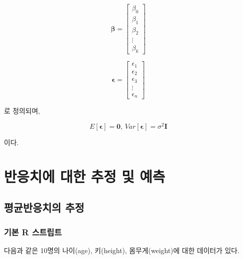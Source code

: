 \documentclass[]{book}
\begin{document}
\[
\boldsymbol{\beta} = \left[ \begin{array}{c}
\beta_0 \\ \beta_1 \\ \beta_2 \\ \vdots \\ \beta_k
\end{array} \right]
\]

\[
\boldsymbol{\epsilon} = \left[ \begin{array}{c}
\epsilon_1 \\ \epsilon_2 \\ \epsilon_3 \\ \vdots \\ \epsilon_n
\end{array} \right]
\]

로 정의되며,

\[
E[\boldsymbol{\epsilon}] = \mathbf{0}, \, Var[\boldsymbol{\epsilon}] = \sigma^2 \mathbf{I} 
\]

이다.

\hypertarget{regression-response-confidence-prediction}{%
\section{반응치에 대한 추정 및 예측}\label{regression-response-confidence-prediction}}

\hypertarget{regression-response-confidence}{%
\subsection{평균반응치의 추정}\label{regression-response-confidence}}

\hypertarget{regression-response-confidence-basic-script}{%
\subsubsection{기본 R 스트립트}\label{regression-response-confidence-basic-script}}

다음과 같은 10명의 나이(age), 키(height), 몸무게(weight)에 대한 데이터가 있다.
\end{document}
